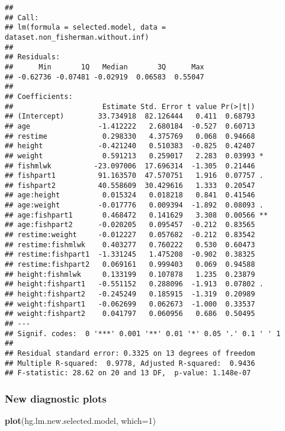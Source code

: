 \documentclass[12pt,]{article}
\newenvironment{Shaded}{\begin{snugshade}}{\end{snugshade}}
\newcommand{\KeywordTok}[1]{\textcolor[rgb]{0.13,0.29,0.53}{\textbf{#1}}}
\newcommand{\DataTypeTok}[1]{\textcolor[rgb]{0.13,0.29,0.53}{#1}}
\newcommand{\DecValTok}[1]{\textcolor[rgb]{0.00,0.00,0.81}{#1}}
\newcommand{\NormalTok}[1]{#1}
\begin{document}
\begin{verbatim}
## 
## Call:
## lm(formula = selected.model, data = dataset.non_fisherman.without.inf)
## 
## Residuals:
##      Min       1Q   Median       3Q      Max 
## -0.62736 -0.07481 -0.02919  0.06583  0.55047 
## 
## Coefficients:
##                     Estimate Std. Error t value Pr(>|t|)   
## (Intercept)        33.734918  82.126444   0.411  0.68793   
## age                -1.412222   2.680184  -0.527  0.60713   
## restime             0.298330   4.375769   0.068  0.94668   
## height             -0.421240   0.510383  -0.825  0.42407   
## weight              0.591213   0.259017   2.283  0.03993 * 
## fishmlwk          -23.097006  17.696314  -1.305  0.21446   
## fishpart1          91.163570  47.570751   1.916  0.07757 . 
## fishpart2          40.558609  30.429616   1.333  0.20547   
## age:height          0.015324   0.018218   0.841  0.41546   
## age:weight         -0.017776   0.009394  -1.892  0.08093 . 
## age:fishpart1       0.468472   0.141629   3.308  0.00566 **
## age:fishpart2      -0.020205   0.095457  -0.212  0.83565   
## restime:weight     -0.012227   0.057682  -0.212  0.83542   
## restime:fishmlwk    0.403277   0.760222   0.530  0.60473   
## restime:fishpart1  -1.331245   1.475208  -0.902  0.38325   
## restime:fishpart2   0.069161   0.999403   0.069  0.94588   
## height:fishmlwk     0.133199   0.107878   1.235  0.23879   
## height:fishpart1   -0.551152   0.288096  -1.913  0.07802 . 
## height:fishpart2   -0.245249   0.185915  -1.319  0.20989   
## weight:fishpart1   -0.062699   0.062673  -1.000  0.33537   
## weight:fishpart2    0.041797   0.060956   0.686  0.50495   
## ---
## Signif. codes:  0 '***' 0.001 '**' 0.01 '*' 0.05 '.' 0.1 ' ' 1
## 
## Residual standard error: 0.3325 on 13 degrees of freedom
## Multiple R-squared:  0.9778, Adjusted R-squared:  0.9436 
## F-statistic: 28.62 on 20 and 13 DF,  p-value: 1.148e-07
\end{verbatim}

\subsubsection{New diagnostic plots}\label{new-diagnostic-plots}

\begin{Shaded}
\begin{Highlighting}[]
\KeywordTok{plot}\NormalTok{(hg.lm.new.selected.model, }\DataTypeTok{which=}\DecValTok{1}\NormalTok{)}
\end{Highlighting}
\end{Shaded}
\end{document}
